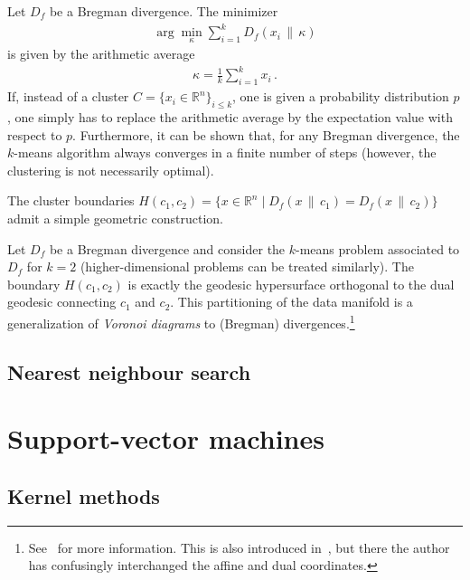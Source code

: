     \begin{property}
        Let $D_f$ be a Bregman divergence. The minimizer
        \begin{gather}
            \arg\min_\kappa\sum_{i=1}^kD_f(x_i\,\|\,\kappa)
        \end{gather}
        is given by the arithmetic average
        \begin{gather}
            \kappa = \frac{1}{k}\sum_{i=1}^kx_i\,.
        \end{gather}
        If, instead of a cluster $C=\{x_i\in\mathbb{R}^n\}_{i\leq k}$, one is given a probability distribution $p$, one simply has to replace the arithmetic average by the expectation value with respect to $p$. Furthermore, it can be shown that, for any Bregman divergence, the $k$-means algorithm always converges in a finite number of steps (however, the clustering is not necessarily optimal).
    \end{property}

    The cluster boundaries $H(c_1, c_2)=\{x\in\mathbb{R}^n\mid D_f(x\,\|\,c_1)=D_f(x\,\|\,c_2)\}$ admit a simple geometric construction.
    \begin{property}
        Let $D_f$ be a Bregman divergence and consider the $k$-means problem associated to $D_f$ for $k=2$ (higher-dimensional problems can be treated similarly). The boundary $H(c_1,c_2)$ is exactly the geodesic hypersurface orthogonal to the dual geodesic connecting $c_1$ and $c_2$. This partitioning of the data manifold is a generalization of \textit{Voronoi diagrams} to (Bregman) divergences.\footnote{See~\citet{boissonnat_bregman_2010} for more information. This is also introduced in~\citet{amari_information_2016}, but there the author has confusingly interchanged the affine and dual coordinates.}
    \end{property}

\subsection{Nearest neighbour search}


\section{Support-vector machines}
\subsection{Kernel methods}

